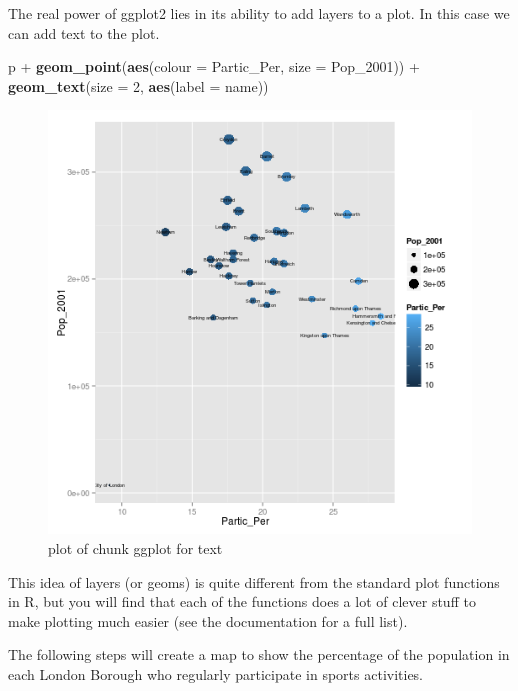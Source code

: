 \documentclass[]{article}
\newenvironment{Shaded}{}{}
\newcommand{\KeywordTok}[1]{\textcolor[rgb]{0.00,0.44,0.13}{\textbf{{#1}}}}
\newcommand{\DataTypeTok}[1]{\textcolor[rgb]{0.56,0.13,0.00}{{#1}}}
\newcommand{\DecValTok}[1]{\textcolor[rgb]{0.25,0.63,0.44}{{#1}}}
\newcommand{\StringTok}[1]{\textcolor[rgb]{0.25,0.44,0.63}{{#1}}}
\newcommand{\NormalTok}[1]{{#1}}
\begin{document}
The real power of ggplot2 lies in its ability to add layers to a plot.
In this case we can add text to the plot.

\begin{Shaded}
\begin{Highlighting}[]
\NormalTok{p +}\StringTok{ }\KeywordTok{geom_point}\NormalTok{(}\KeywordTok{aes}\NormalTok{(}\DataTypeTok{colour =} \NormalTok{Partic_Per, }\DataTypeTok{size =} \NormalTok{Pop_2001)) +}\StringTok{ }\KeywordTok{geom_text}\NormalTok{(}\DataTypeTok{size =} \DecValTok{2}\NormalTok{, }
    \KeywordTok{aes}\NormalTok{(}\DataTypeTok{label =} \NormalTok{name))}
\end{Highlighting}
\end{Shaded}

\begin{figure}[htbp]
\centering
\includegraphics{figure/ggplot_for_text.png}
\caption{plot of chunk ggplot for text}
\end{figure}

This idea of layers (or geoms) is quite different from the standard plot
functions in R, but you will find that each of the functions does a lot
of clever stuff to make plotting much easier (see the documentation for
a full list).

The following steps will create a map to show the percentage of the
population in each London Borough who regularly participate in sports
activities.
\end{document}
